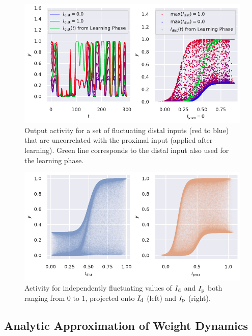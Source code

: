 \documentclass[10pt,a4paper,draft]{article}
\begin{document}
\begin{figure}
	\centering
	\includegraphics[width=\textwidth]{./figures/output_modulation_sweep_decorr_input.pdf}
	\caption{Output activity for a set of fluctuating distal inputs (red to blue) that are uncorrelated with the proximal input (applied after learning). Green line corresponds to the distal input also used for the learning phase.}
	\label{fig:altern_dist_sweep_mod}
\end{figure}

\begin{figure}
	\centering
	\includegraphics[width=\textwidth]{./figures/output_modulation_max_distal.pdf}
	\caption{Activity for independently fluctuating values of $I_{\rm d}$ and $I_{\rm p}$ both ranging from $0$ to $1$, projected onto $I_{\rm d}$ (left) and $I_{\rm p}$ (right).}
	\label{fig:output_mod_project}
\end{figure}

\subsection{Analytic Approximation of Weight Dynamics}
\end{document}
